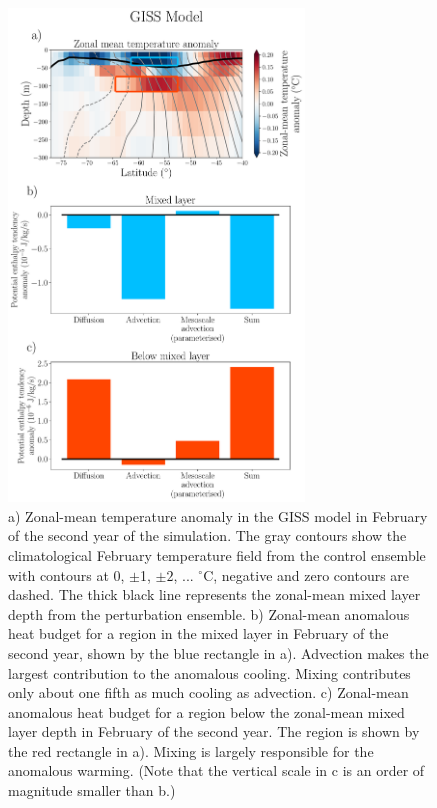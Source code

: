 \documentclass{ametsocV5}
\begin{document}




\begin{figure}[!ht]
    \begin{center}
        \includegraphics[width=0.7\textwidth]{figures/GISS_zm_temperature_anoms_heat_budget.pdf}
        \caption{a) Zonal-mean temperature anomaly in the GISS model in February of the second year of the simulation. The gray contours show the climatological February temperature field from the control ensemble with contours at 0, $\pm$1, $\pm2$, ... $^{\circ}$C, negative and zero contours are dashed. The thick black line represents the zonal-mean mixed layer depth from the perturbation ensemble.
        b) Zonal-mean anomalous heat budget for a region in the mixed layer in February of the second year, shown by the blue rectangle in a). Advection makes the largest contribution to the anomalous cooling. Mixing contributes only about one fifth as much cooling as advection.
        c) Zonal-mean anomalous heat budget for a region below the zonal-mean mixed layer depth in February of the second year. The region is shown by the red rectangle in a). Mixing is largely responsible for the anomalous warming. (Note that the vertical scale in c is an order of magnitude smaller than b.)}
        \label{fig:GISS_zm_temperature_anoms_heat_budget}
    \end{center}
\end{figure}
\end{document}
